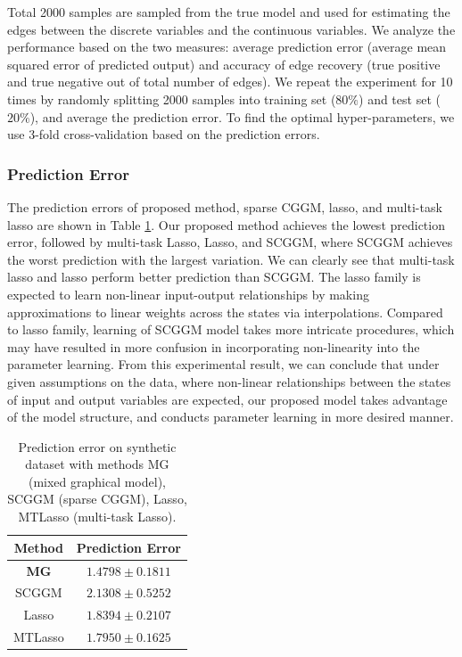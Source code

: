 \documentclass{article}
\begin{document}
 Total 2000 samples are sampled from the true model and used for estimating the edges between the discrete variables and the continuous variables. 
 We analyze the performance based on the two measures: average prediction error (average mean squared error of predicted output) and accuracy of edge recovery (true positive and true negative out of total number of edges).
We repeat the experiment for 10 times by randomly splitting 2000 samples into training set ($80\%$) and test set ($20\%$), and average the prediction error.
 To find the optimal hyper-parameters, we use 3-fold cross-validation based on the prediction errors.
 
 
 
 
 

\subsubsection{Prediction Error}

The prediction errors of proposed method, sparse CGGM, lasso, and multi-task lasso are shown in Table \ref{table:syn_pred_err}.
Our proposed method achieves the lowest prediction error, followed by multi-task Lasso, Lasso, and SCGGM, where SCGGM achieves the worst prediction with the largest variation.
We can clearly see that multi-task lasso and lasso perform better prediction than SCGGM.
The lasso family is expected to learn non-linear input-output relationships by making approximations to linear weights across the states via interpolations.
Compared to lasso family, learning of SCGGM model takes more intricate procedures, which may have resulted in more confusion in incorporating non-linearity into the parameter learning.
From this experimental result, we can conclude that under given assumptions on the data, where non-linear relationships between the states of input and output variables are expected, our proposed model takes advantage of the model structure, and conducts parameter learning in more desired manner.



 
\begin{table}[hbtp]
\begin{center}
    \begin{tabular}{| c | c |}
    \hline
    Method & Prediction Error \\
    \hline
    \textbf{MG} & $\mathbf{1.4798 \pm 0.1811}$ \\
    SCGGM & $2.1308 \pm 0.5252$  \\
    Lasso & $1.8394 \pm 0.2107$  \\
    MTLasso & $1.7950 \pm 0.1625$ \\
    \hline 
    \end{tabular}
\end{center}
 	\caption{Prediction error on synthetic dataset with methods MG (mixed graphical model), SCGGM (sparse CGGM), Lasso, MTLasso (multi-task Lasso).}
 \label{table:syn_pred_err}
\end{table}
\end{document}
